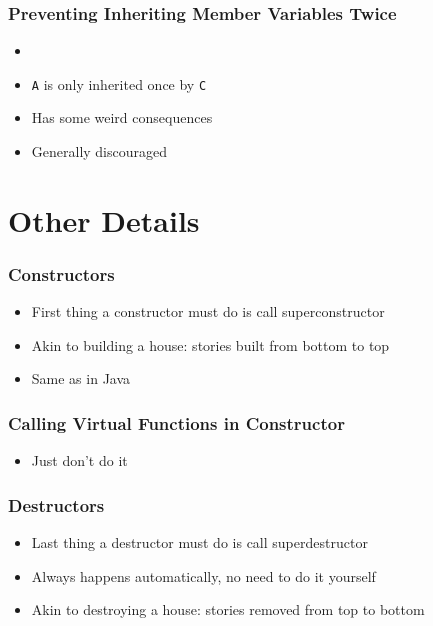 \documentclass{../ucll-slides}
\begin{document}
\begin{frame}
  \frametitle{Preventing Inheriting Member Variables Twice}
  \begin{itemize}
    \item {}
    \item {\tt A} is only inherited once by {\tt C}
    \item Has some weird consequences
    \item Generally discouraged
  \end{itemize}
\end{frame}

\section{Other Details}

\begin{frame}
  \tableofcontents[currentsection]
\end{frame}

\begin{frame}
  \frametitle{Constructors}
  \begin{itemize}
    \item First thing a constructor must do is call superconstructor
    \item Akin to building a house: stories built from bottom to top
    \item Same as in Java
  \end{itemize}
\end{frame}

\begin{frame}
  \frametitle{Calling Virtual Functions in Constructor}
  \begin{itemize}
    \item Just don't do it
  \end{itemize}
\end{frame}

\begin{frame}
  \frametitle{Destructors}
  \begin{itemize}
    \item Last thing a destructor must do is call superdestructor
    \item Always happens automatically, no need to do it yourself
    \item Akin to destroying a house: stories removed from top to bottom
  \end{itemize}
\end{frame}
\end{document}
